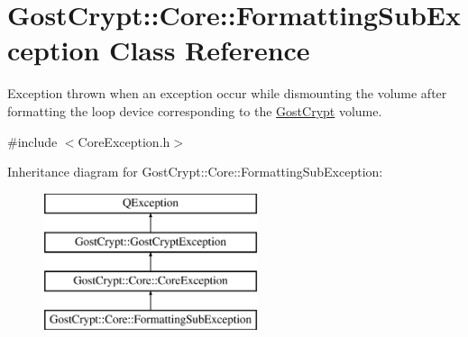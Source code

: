 \hypertarget{class_gost_crypt_1_1_core_1_1_formatting_sub_exception}{}\section{Gost\+Crypt\+:\+:Core\+:\+:Formatting\+Sub\+Exception Class Reference}
\label{class_gost_crypt_1_1_core_1_1_formatting_sub_exception}


Exception thrown when an exception occur while dismounting the volume after formatting the loop device corresponding to the \hyperlink{namespace_gost_crypt}{Gost\+Crypt} volume.  




{\ttfamily \#include $<$Core\+Exception.\+h$>$}

Inheritance diagram for Gost\+Crypt\+:\+:Core\+:\+:Formatting\+Sub\+Exception\+:\begin{figure}[H]
\begin{center}
\leavevmode
\includegraphics[height=4.000000cm]{class_gost_crypt_1_1_core_1_1_formatting_sub_exception}
\end{center}
\end{figure}
